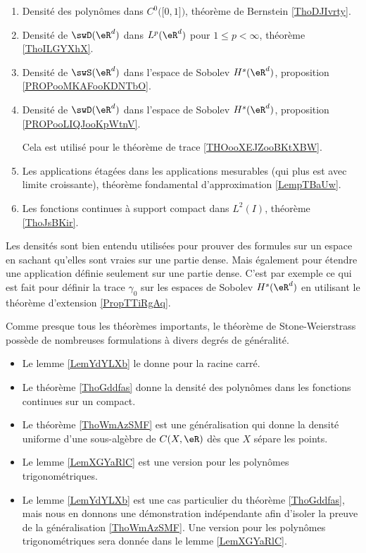          \label{THEooPUIIooLDPUuq}
\begin{enumerate}
    \item 
        Densité des polynômes dans \( C^0\big( \mathopen[ 0 , 1 \mathclose] \big)\), théorème de Bernstein \ref{ThoDJIvrty}.
    \item
        Densité de \( \swD(\eR^d)\) dans \( L^p(\eR^d)\) pour \( 1\leq p<\infty\), théorème \ref{ThoILGYXhX}.
    \item
        Densité de \( \swS(\eR^d)\) dans l'espace de Sobolev \( H^s(\eR^d)\), proposition \ref{PROPooMKAFooKDNTbO}. 

    \item
        Densité de \( \swD(\eR^d)\) dans l'espace de Sobolev \( H^s(\eR^d)\), proposition \ref{PROPooLIQJooKpWtnV}. 

        Cela est utilisé pour le théorème de trace \ref{THOooXEJZooBKtXBW}.
    \item
        Les applications étagées dans les applications mesurables (qui plus est avec limite croissante), théorème fondamental d'approximation \ref{LempTBaUw}.
    \item
        Les fonctions continues à support compact dans \( L^2(I)\), théorème \ref{ThoJsBKir}.
\end{enumerate}
Les densités sont bien entendu utilisées pour prouver des formules sur un espace en sachant qu'elles sont vraies sur une partie dense. Mais également pour étendre une application définie seulement sur une partie dense. C'est par exemple ce qui est fait pour définir la trace \( \gamma_0\) sur les espaces de Sobolev \( H^s(\eR^d)\) en utilisant le théorème d'extension \ref{PropTTiRgAq}.

Comme presque tous les théorèmes importants, le théorème de Stone-Weierstrass possède de nombreuses formulations à divers degrés de généralité.
\begin{itemize}
    \item Le lemme \ref{LemYdYLXb} le donne pour la racine carré.
    \item Le théorème \ref{ThoGddfas} donne la densité des polynômes dans les fonctions continues sur un compact.
    \item Le théorème \ref{ThoWmAzSMF} est une généralisation qui donne la densité uniforme d'une sous-algèbre de \( C(X,\eR)\) dès que \( X\) sépare les points.
    \item Le lemme \ref{LemXGYaRlC} est une version pour les polynômes trigonométriques.
    \item
        Le lemme \ref{LemYdYLXb} est une cas particulier du
        théorème \ref{ThoGddfas}, mais nous en donnons une démonstration indépendante afin d'isoler la preuve
de la généralisation \ref{ThoWmAzSMF}. 
Une version pour les polynômes trigonométriques sera donnée dans le lemme \ref{LemXGYaRlC}.
\end{itemize}
